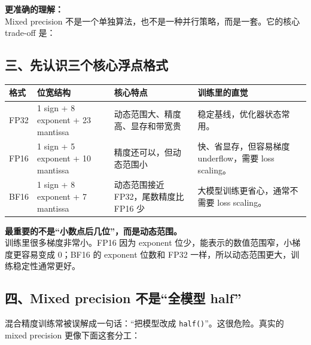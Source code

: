 \begin{intubox}
\textbf{更准确的理解：}\\
Mixed precision 不是一个单独算法，也不是一种并行策略，而是一套。它的核心 trade-off 是：
\end{intubox}

\subsection{三、先认识三个核心浮点格式}

\begin{center}
{\small
\begin{tabular}{p{2.5cm}p{3.1cm}p{3.4cm}p{3.6cm}}
\hline
\textbf{格式} & \textbf{位宽结构} & \textbf{核心特点} & \textbf{训练里的直觉} \\
\hline
FP32 & 1 sign + 8 exponent + 23 mantissa & 动态范围大、精度高、显存和带宽贵 & 稳定基线，优化器状态常用。 \\
FP16 & 1 sign + 5 exponent + 10 mantissa & 精度还可以，但动态范围小 & 快、省显存，但容易梯度 underflow，需要 loss scaling。 \\
BF16 & 1 sign + 8 exponent + 7 mantissa & 动态范围接近 FP32，尾数精度比 FP16 少 & 大模型训练更省心，通常不需要 loss scaling。 \\
\hline
\end{tabular}
}
\end{center}

\begin{intubox}
\textbf{最重要的不是“小数点后几位”，而是动态范围。}\\
训练里很多梯度非常小。FP16 因为 exponent 位少，能表示的数值范围窄，小梯度更容易变成 0；BF16 的 exponent 位数和 FP32 一样，所以动态范围更大，训练稳定性通常更好。
\end{intubox}

\subsection{四、Mixed precision 不是“全模型 half”}

混合精度训练常被误解成一句话：“把模型改成 \texttt{half()}”。这很危险。真实的 mixed precision 更像下面这套分工：


